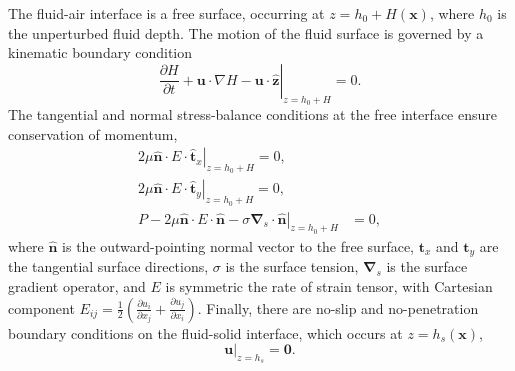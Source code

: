 \documentclass[aps,pre,amsmath,amssymb,floatfix,onecolumn,notitlepage,10pt]{revtex4-1}
\begin{document}
The fluid-air interface is a free surface, occurring at $z=h_0 + H(\mathbf{x})$, where $h_0$ is the unperturbed fluid depth. The motion of the fluid surface is governed by a kinematic boundary condition
\begin{equation}
\left. \frac{\partial H}{\partial t} + \mathbf{u}\cdot\nabla H - \mathbf{u}\cdot\hat{\mathbf{z}} \right\rvert_{z=h_0+H} = 0. \label{kinematic}
\end{equation}
The tangential and normal  stress-balance conditions at the free interface ensure conservation of momentum,
\begin{align}
\left. 2\mu\hat{\mathbf{n}}\cdot E \cdot \hat{\mathbf{t}}_x  \right\rvert_{z=h_0+H} = 0,  \label{tangentialstress1} \\
\left. 2\mu\hat{\mathbf{n}}\cdot E \cdot \hat{\mathbf{t}}_y  \right\rvert_{z=h_0+H}  = 0, \label{tangentialstress2} \\
\left. P - 2\mu \hat{\mathbf{n}} \cdot E \cdot \hat{\mathbf{n}} - \sigma \bm{\nabla}_s \cdot \hat{\mathbf{n}}  \right\rvert_{z=h_0+H} &= 0, \label{normalstress}
\end{align}
where $\hat{\mathbf{n}}$ %
is the outward-pointing normal vector to the free surface, $\mathbf{t}_x$ and $\mathbf{t}_y$ are the tangential surface directions, $\sigma$ is the surface tension, $\bm{\nabla}_s$ is the surface gradient operator, and $E$ is symmetric the rate of strain tensor, with Cartesian component $E_{ij} = \frac{1}{2}\left(\frac{\partial u_{i}}{\partial x_j} + \frac{\partial u_{j}}{\partial x_i}\right)$.
Finally, there are no-slip and no-penetration boundary conditions on the fluid-solid interface, which occurs at $z=h_s(\mathbf{x})$,
\begin{equation}
\left. \mathbf{u} \right\rvert_{z=h_s} = \mathbf{0}. \label{noslip}
\end{equation}
\end{document}
